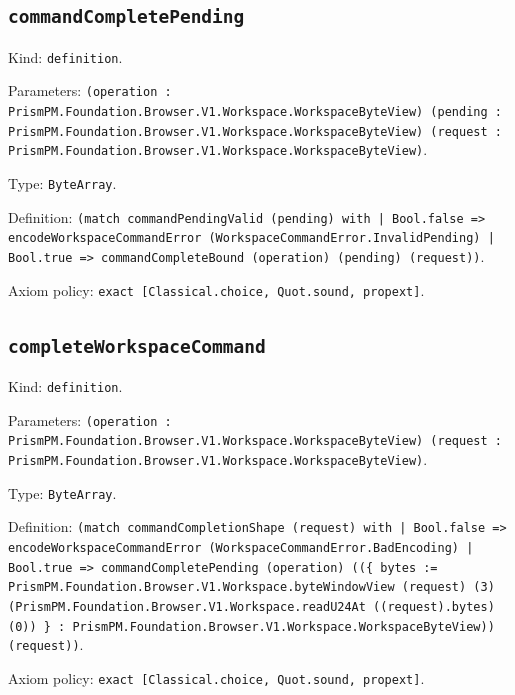 \documentclass[11pt]{article}
\begin{document}
\subsection*{\texttt{commandCompletePending}}
\noindent Kind: \texttt{definition}.\par
\noindent Parameters: \texttt{(operation : PrismPM.Foundation.Browser.V1.Workspace.WorkspaceByteView) (pending : PrismPM.Foundation.Browser.V1.Workspace.WorkspaceByteView) (request : PrismPM.Foundation.Browser.V1.Workspace.WorkspaceByteView)}.\par
\noindent Type: \texttt{ByteArray}.\par
\noindent Definition: \texttt{(match commandPendingValid (pending) with | Bool.false => encodeWorkspaceCommandError (WorkspaceCommandError.InvalidPending) | Bool.true => commandCompleteBound (operation) (pending) (request))}.\par
\noindent Axiom policy: \texttt{exact [Classical.choice, Quot.sound, propext]}.\par
\subsection*{\texttt{completeWorkspaceCommand}}
\noindent Kind: \texttt{definition}.\par
\noindent Parameters: \texttt{(operation : PrismPM.Foundation.Browser.V1.Workspace.WorkspaceByteView) (request : PrismPM.Foundation.Browser.V1.Workspace.WorkspaceByteView)}.\par
\noindent Type: \texttt{ByteArray}.\par
\noindent Definition: \texttt{(match commandCompletionShape (request) with | Bool.false => encodeWorkspaceCommandError (WorkspaceCommandError.BadEncoding) | Bool.true => commandCompletePending (operation) ((\{ bytes := PrismPM.Foundation.Browser.V1.Workspace.byteWindowView (request) (3) (PrismPM.Foundation.Browser.V1.Workspace.readU24At ((request).bytes) (0)) \} : PrismPM.Foundation.Browser.V1.Workspace.WorkspaceByteView)) (request))}.\par
\noindent Axiom policy: \texttt{exact [Classical.choice, Quot.sound, propext]}.\par
\end{document}
